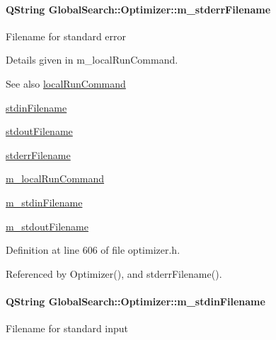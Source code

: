 \hypertarget{classGlobalSearch_1_1Optimizer_a75b800a7f90a03d551f6795404d0c8f1}{}
\paragraph[{m\+\_\+stderr\+Filename}]{\setlength{\rightskip}{0pt plus 5cm}Q\+String Global\+Search\+::\+Optimizer\+::m\+\_\+stderr\+Filename\hspace{0.3cm}{\ttfamily [protected]}}\label{classGlobalSearch_1_1Optimizer_a75b800a7f90a03d551f6795404d0c8f1}
Filename for standard error

Details given in m\+\_\+local\+Run\+Command.

\begin{DoxySeeAlso}{See also}
\hyperlink{classGlobalSearch_1_1Optimizer_aed5eb285d45a001c9520c2ed3a5b57a1}{local\+Run\+Command} 

\hyperlink{classGlobalSearch_1_1Optimizer_a5964a9b38d3ae90c8ac36a75d3a35832}{stdin\+Filename} 

\hyperlink{classGlobalSearch_1_1Optimizer_a217750aa50431f9948aa8164fb99de0c}{stdout\+Filename} 

\hyperlink{classGlobalSearch_1_1Optimizer_acaa83cc6bf1dcc263b92450b4f8cb652}{stderr\+Filename} 

\hyperlink{classGlobalSearch_1_1Optimizer_a1cdb6b6c5e929e84c834ba93148fb31e}{m\+\_\+local\+Run\+Command} 

\hyperlink{classGlobalSearch_1_1Optimizer_aca91d12d7aecae052d6ab5ae158acec6}{m\+\_\+stdin\+Filename} 

\hyperlink{classGlobalSearch_1_1Optimizer_a5ed04fdd5f8b511249e408adcd174550}{m\+\_\+stdout\+Filename} 
\end{DoxySeeAlso}


Definition at line 606 of file optimizer.\+h.



Referenced by Optimizer(), and stderr\+Filename().

\hypertarget{classGlobalSearch_1_1Optimizer_aca91d12d7aecae052d6ab5ae158acec6}{}
\paragraph[{m\+\_\+stdin\+Filename}]{\setlength{\rightskip}{0pt plus 5cm}Q\+String Global\+Search\+::\+Optimizer\+::m\+\_\+stdin\+Filename\hspace{0.3cm}{\ttfamily [protected]}}\label{classGlobalSearch_1_1Optimizer_aca91d12d7aecae052d6ab5ae158acec6}
Filename for standard input

